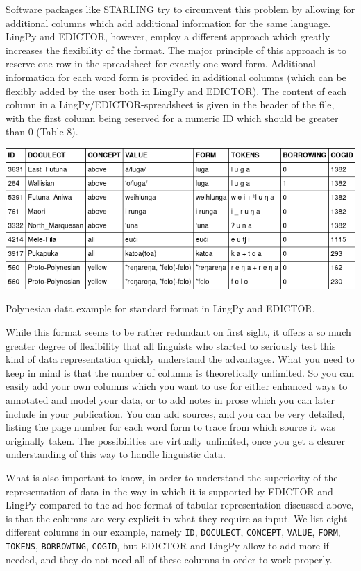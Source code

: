 \documentclass[a4paper,svgnames]{scrartcl}
\begin{document}
Software packages like STARLING try to circumvent this problem by
allowing for additional columns which add additional information for the
same language. LingPy and EDICTOR, however, employ a different approach
which greatly increases the flexibility of the format. The major
principle of this approach is to reserve one row in the spreadsheet for
exactly one word form. Additional information for each word form is
provided in additional columns (which can be flexibly added by the user
both in LingPy and EDICTOR). The content of each column in a
LingPy/EDICTOR-spreadsheet is given in the header of the file, with the
first column being reserved for a numeric ID which should be greater
than 0 (Table 8).

\begin{table}
\centering
\includegraphics[width=\textwidth]{images/table-8.png}
\caption{Polynesian data example for standard format in LingPy
and EDICTOR.}
\end{table}

While this format seems to be rather redundant on first sight, it offers
a so much greater degree of flexibility that all linguists who started
to seriously test this kind of data representation quickly understand
the advantages. What you need to keep in mind is that the number of
columns is theoretically unlimited. So you can easily add your own
columns which you want to use for either enhanced ways to annotated and
model your data, or to add notes in prose which you can later include in
your publication. You can add sources, and you can be very detailed,
listing the page number for each word form to trace from which source it
was originally taken. The possibilities are virtually unlimited, once
you get a clearer understanding of this way to handle linguistic data.

What is also important to know, in order to understand the superiority
of the representation of data in the way in which it is supported by
EDICTOR and LingPy compared to the ad-hoc format of tabular
representation discussed above, is that the columns are very explicit in
what they require as input. We list eight different columns in our
example, namely \texttt{ID}, \texttt{DOCULECT}, \texttt{CONCEPT},
\texttt{VALUE}, \texttt{FORM}, \texttt{TOKENS}, \texttt{BORROWING},
\texttt{COGID}, but EDICTOR and LingPy allow to add more if needed, and
they do not need all of these columns in order to work properly.
\end{document}
